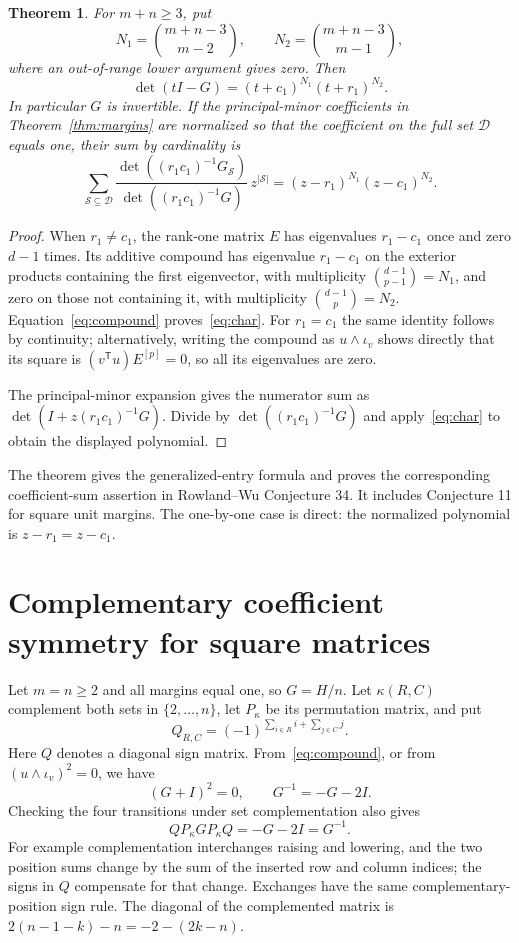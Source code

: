 \documentclass[11pt]{article}
\newtheorem{theorem}{Theorem}
\newcommand{\D}{\mathcal D}
\begin{document}
\begin{theorem}\label{thm:coeffsum}
For $m+n\geq3$, put
\[
 N_1=\binom{m+n-3}{m-2},\qquad N_2=\binom{m+n-3}{m-1},
\]
where an out-of-range lower argument gives zero. Then
\begin{equation}\label{eq:char}
 \det(tI-G)=(t+c_1)^{N_1}(t+r_1)^{N_2}.
\end{equation}
In particular $G$ is invertible. If the principal-minor coefficients in Theorem~\ref{thm:margins} are normalized so that the coefficient on the full set $\D$ equals one, their sum by cardinality is
\[
 \boxed{\quad
 \sum_{\mathcal S\subseteq\D}
 \frac{\det((r_1c_1)^{-1}G_{\mathcal S})}
 {\det((r_1c_1)^{-1}G)}\,z^{|\mathcal S|}
 =(z-r_1)^{N_1}(z-c_1)^{N_2}.\quad}
\]
\end{theorem}
\begin{proof}
When $r_1\ne c_1$, the rank-one matrix $E$ has eigenvalues $r_1-c_1$ once and zero $d-1$ times. Its additive compound has eigenvalue $r_1-c_1$ on the exterior products containing the first eigenvector, with multiplicity $\binom{d-1}{p-1}=N_1$, and zero on those not containing it, with multiplicity $\binom{d-1}{p}=N_2$. Equation~\eqref{eq:compound} proves~\eqref{eq:char}. For $r_1=c_1$ the same identity follows by continuity; alternatively, writing the compound as $u\wedge\iota_v$ shows directly that its square is $(v^{\mathsf T}u)E^{[p]}=0$, so all its eigenvalues are zero.

The principal-minor expansion gives the numerator sum as $\det(I+z(r_1c_1)^{-1}G)$. Divide by $\det((r_1c_1)^{-1}G)$ and apply~\eqref{eq:char} to obtain the displayed polynomial.
\end{proof}
The theorem gives the generalized-entry formula and proves the corresponding coefficient-sum assertion in Rowland--Wu Conjecture 34. It includes Conjecture 11 for square unit margins. The one-by-one case is direct: the normalized polynomial is $z-r_1=z-c_1$.

\section{Complementary coefficient symmetry for square matrices}
Let $m=n\geq2$ and all margins equal one, so $G=H/n$. Let $\kappa(R,C)$ complement both sets in $\{2,\ldots,n\}$, let $P_\kappa$ be its permutation matrix, and put
\[
 Q_{R,C}=(-1)^{\sum_{i\in R}i+\sum_{j\in C}j}.
\]
Here $Q$ denotes a diagonal sign matrix. From~\eqref{eq:compound}, or from $(u\wedge\iota_v)^2=0$, we have
\[
 (G+I)^2=0,\qquad G^{-1}=-G-2I.
\]
Checking the four transitions under set complementation also gives
\[
 QP_\kappa G P_\kappa Q=-G-2I=G^{-1}.
\]
For example complementation interchanges raising and lowering, and the two position sums change by the sum of the inserted row and column indices; the signs in $Q$ compensate for that change. Exchanges have the same complementary-position sign rule. The diagonal of the complemented matrix is $2(n-1-k)-n=-2-(2k-n)$.
\end{document}
